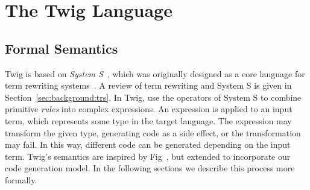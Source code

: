 
\chapter{The Twig Language}
\label{ch:semantics}

\section{Formal Semantics}
\label{sec:sem:formal}

Twig is based on \emph{System S}~\cite{system-s}, which was
originally designed as a core language for term rewriting
systems~\cite{baader98rewriting}. A review of term rewriting and
System S is given in Section~\ref{sec:background:trs}. In Twig,
use the operators of System S to combine primitive \emph{rules}
into complex expressions. An expression is applied to an input
term, which represents some type in the target language. The
expression may transform the given type, generating code as a side
effect, or the transformation may fail. In this way, different
code can be generated depending on the input term. Twig's
semantics are inspired by Fig~\cite{fig}, but extended to
incorporate our code generation model. In the following sections
we describe this process more formally.





